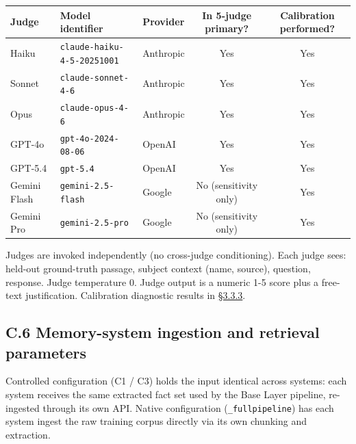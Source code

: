 \begin{longtable}[]{@{}lllcc@{}}
\toprule
Judge & Model identifier & Provider & In 5-judge primary? & Calibration
performed? \\
\midrule
\endhead
Haiku & \texttt{claude-haiku-4-5-20251001} & Anthropic & Yes & Yes \\
Sonnet & \texttt{claude-sonnet-4-6} & Anthropic & Yes & Yes \\
Opus & \texttt{claude-opus-4-6} & Anthropic & Yes & Yes \\
GPT-4o & \texttt{gpt-4o-2024-08-06} & OpenAI & Yes & Yes \\
GPT-5.4 & \texttt{gpt-5.4} & OpenAI & Yes & Yes \\
Gemini Flash & \texttt{gemini-2.5-flash} & Google & No (sensitivity
only) & Yes \\
Gemini Pro & \texttt{gemini-2.5-pro} & Google & No (sensitivity only) &
Yes \\
\bottomrule
\end{longtable}

Judges are invoked independently (no cross-judge conditioning). Each
judge sees: held-out ground-truth passage, subject context (name,
source), question, response. Judge temperature 0. Judge output is a
numeric 1-5 score plus a free-text justification. Calibration diagnostic
results in \hyperref[calibration]{§3.3.3}.

\hypertarget{c.6-memory-system-ingestion-and-retrieval-parameters}{%
\subsection{C.6 Memory-system ingestion and retrieval
parameters}\label{c.6-memory-system-ingestion-and-retrieval-parameters}}

Controlled configuration (C1 / C3) holds the input identical across
systems: each system receives the same extracted fact set used by the
Base Layer pipeline, re-ingested through its own API. Native
configuration (\texttt{\_fullpipeline}) has each system ingest the raw
training corpus directly via its own chunking and extraction.

